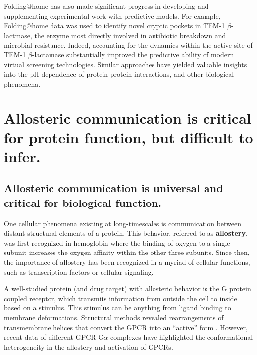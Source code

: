 \documentclass[../main.tex]{subfiles}
\begin{document}
		Folding@home has also made significant progress in developing and supplementing experimental work with predictive models. For example, Folding@home data was used to identify novel cryptic pockets in TEM-1 $\beta$-lactmase\cite{Porter:2019hv}, the enzyme most directly involved in antibiotic breakdown and microbial resistance. Indeed, accounting for the dynamics within the active site of TEM-1 $\beta$-lactamase substantially improved the predictive ability of modern virtual screening technologies\cite{Hart:2016kb}. Similar approaches have yielded valuable insights into the pH dependence of protein-protein interactions\cite{pascolutti_structure_2016}, and other biological phenomena.

\section{Allosteric communication is critical for protein function, but difficult to infer.}
	\subsection{Allosteric communication is universal and critical for biological function.}
		One cellular phenomena existing at long-timescales is communication between distant structural elements of a protein. This behavior, referred to as \textbf{allostery}\cite{hilser_ensemble_2010}, was first recognized in hemoglobin\cite{Perutz:1970vb} where the binding of oxygen to a single subunit increases the oxygen affinity within the other three subunits. Since then, the importance of allostery has been recognized in a myriad of cellular functions, such as transcription factors\cite{Tzeng:2009im,Tzeng:2011by} or cellular signaling\cite{Weis:2018fj}.

		A well-studied protein (and drug target) with allosteric behavior is the G protein coupled receptor, which transmits information from outside the cell to inside based on a stimulus. This stimulus can be anything from ligand binding\cite{wacker_how_2017} to membrane deformations\cite{rosholm_membrane_2017}. Structural methods revealed rearrangements of transmembrane helices that convert the GPCR into an “active” form \cite{Rasmussen:2011kp}. However, recent data of different GPCR-G$\alpha$ complexes have highlighted the conformational heterogeneity in the allostery and activation of GPCRs\cite{Koehl:2018fv,DraperJoyce:2018il,GarciaNafria:2018hu,Kang:2018kq}.
\end{document}
